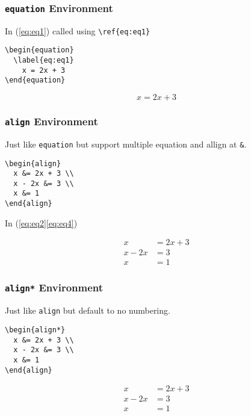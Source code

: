 \documentclass{beamer}
\begin{document}
\begin{frame}[fragile]
  \frametitle{\texttt{equation} Environment}

  In (\ref{eq:eq1}) called using \verb|\ref{eq:eq1}|

  \begin{verbatim}
\begin{equation}
  \label{eq:eq1}
    x = 2x + 3
\end{equation}
  \end{verbatim}

  \begin{equation}
    \label{eq:eq1}
      x = 2x + 3
  \end{equation}
\end{frame}

\begin{frame}[fragile]
  \frametitle{\texttt{align} Environment}

  Just like \texttt{equation} but support multiple equation and allign at \verb|&|.
  \begin{verbatim}
\begin{align}
  x &= 2x + 3 \\
  x - 2x &= 3 \\
  x &= 1
\end{align}
    \end{verbatim}

  In (\ref{eq:eq2}\textendash\ref{eq:eq4})

  \begin{align}
    x &= 2x + 3 \label{eq:eq2} \\
    x - 2x &= 3 \label{eq:eq3} \\
    x &= 1 \label{eq:eq4}
  \end{align}
\end{frame}

\begin{frame}[fragile]
  \frametitle{\texttt{align*} Environment}

  Just like \texttt{align} but default to no numbering.
  \begin{verbatim}
\begin{align*}
  x &= 2x + 3 \\
  x - 2x &= 3 \\
  x &= 1
\end{align}
    \end{verbatim}

  \begin{align*}
    x &= 2x + 3 \\
    x - 2x &= 3 \\
    x &= 1
  \end{align*}
\end{frame}
\end{document}
